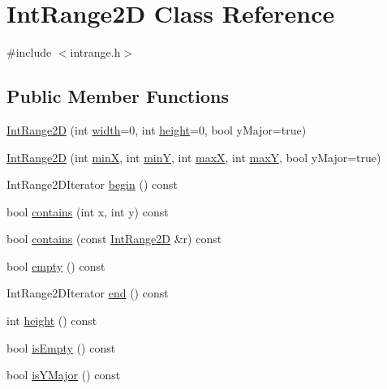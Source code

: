 \hypertarget{classIntRange2D}{}\section{Int\+Range2D Class Reference}
\label{classIntRange2D}


{\ttfamily \#include $<$intrange.\+h$>$}

\subsection*{Public Member Functions}
\begin{DoxyCompactItemize}
\item 
\mbox{\hyperlink{classIntRange2D_a39f2016ab50300a0d0e76d60fe958356}{Int\+Range2D}} (int \mbox{\hyperlink{classIntRange2D_ad72663daf610f2a0833a2fc3d78e4fdf}{width}}=0, int \mbox{\hyperlink{classIntRange2D_ad3774f6419003470f54fd495124ef51f}{height}}=0, bool y\+Major=true)
\item 
\mbox{\hyperlink{classIntRange2D_a22f22b7ce16863ba7acc111a2b26018b}{Int\+Range2D}} (int \mbox{\hyperlink{classIntRange2D_a1a1724b4b31e3d3d251e5816c7d9e448}{minX}}, int \mbox{\hyperlink{classIntRange2D_a2337641dec44ff553785d9c143c3aafd}{minY}}, int \mbox{\hyperlink{classIntRange2D_aa9493e60175cb4e130ae4cfba2b55907}{maxX}}, int \mbox{\hyperlink{classIntRange2D_a015dcf4989cbafff40d5a345b9d9f959}{maxY}}, bool y\+Major=true)
\item 
Int\+Range2\+D\+Iterator \mbox{\hyperlink{classIntRange2D_a5840f252f949c3f9c0bd1085250a8615}{begin}} () const
\item 
bool \mbox{\hyperlink{classIntRange2D_a39725eb73188fbf2a4b790b1a6849815}{contains}} (int x, int y) const
\item 
bool \mbox{\hyperlink{classIntRange2D_a3c4705ae7b99ee1d5cd6326e5f2869bf}{contains}} (const \mbox{\hyperlink{classIntRange2D}{Int\+Range2D}} \&r) const
\item 
bool \mbox{\hyperlink{classIntRange2D_a644718bb2fb240de962dc3c9a1fdf0dc}{empty}} () const
\item 
Int\+Range2\+D\+Iterator \mbox{\hyperlink{classIntRange2D_aa7bf3d68f7aec8215aa12584f8c47443}{end}} () const
\item 
int \mbox{\hyperlink{classIntRange2D_ad3774f6419003470f54fd495124ef51f}{height}} () const
\item 
bool \mbox{\hyperlink{classIntRange2D_acf82f9b2937375c7b1cf3dccb3df3312}{is\+Empty}} () const
\item 
bool \mbox{\hyperlink{classIntRange2D_a7387191f7e5206084124db7bc29d1891}{is\+Y\+Major}} () const

\end{DoxyCompactItemize}
